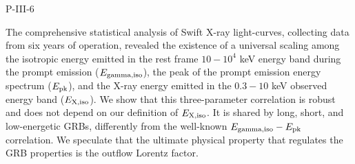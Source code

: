 P-III-6


\bigskip



\bigskip

\noindent The comprehensive statistical analysis of Swift X-ray light-curves, collecting data from six years of operation, revealed the existence of a universal scaling among the isotropic energy emitted in the rest frame $10-10^4$ keV energy band during the prompt emission ($E_{\rm gamma,iso}$), the peak of the prompt emission energy spectrum ($E_{\rm pk}$), and the X-ray energy emitted in the $0.3-10$ keV observed energy band ($E_{\rm X,iso}$). We show that this three-parameter correlation is robust and does not depend on our definition of $E_{\rm X,iso}$. It is shared by long, short, and low-energetic GRBs, differently from the well-known $E_{\rm gamma,iso}-E_{\rm pk}$ correlation. We speculate that the ultimate physical property that regulates the GRB properties is the outflow Lorentz factor.

